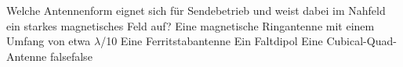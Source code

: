     {Welche Antennenform eignet sich für Sendebetrieb und weist dabei im Nahfeld ein starkes magnetisches Feld auf?}
    {Eine magnetische Ringantenne mit einem Umfang von etwa $\lambda$/10}
    {Eine Ferritstabantenne}
    {Ein Faltdipol}
    {Eine Cubical-Quad-Antenne}
    {false}{false}